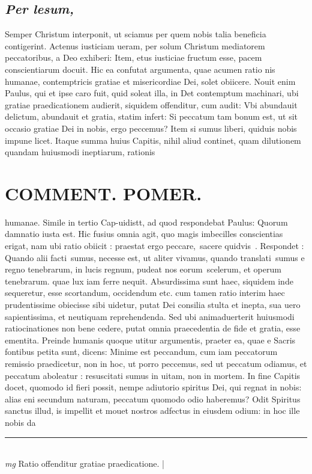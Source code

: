 \documentclass{article}
\begin{document}
\begin{pages}
\subsection*{\textit{Per lesum, }}\pstart Semper Christum interponit, ut sciamus per quem nobis talia beneficia contigerint.   \pend\pstart Actenus iusticiam ueram, per solum Christum mediatorem peccatoribus, a Deo exhiberi: Item, etus iusticiae fructum esse, pacem conscientiarum docuit. Hic ea confutat argumenta, quae acumen ratio nis humanae, contemptricis gratiae et misericordiae Dei, solet obiicere. Nouit enim Paulus, qui et ipse caro fuit, quid soleat illa, in Det contemptum machinari, ubi gratiae praedicationem audierit, siquidem offenditur, cum audit: Vbi abundauit delictum, abundauit et gratia, statim infert: Si peccatum tam bonum est, ut sit occasio gratiae Dei in nobis, ergo peccemus? Item si sumus liberi, quiduis nobis impune licet.  Itaque summa huius Capitis, nihil aliud continet, quam dilutionem quandam huiusmodi ineptiarum, rationis  \pend
\section*{COMMENT. POMER.  }\pstart humanae. Simile in tertio Cap-uidistt, ad quod respondebat Paulus: Quorum damnatio iusta est. Hic fusius omnia agit, quo magis imbecilles conscientias erigat, nam ubi ratio obiicit : praestat ergo peccare, sacere quidvis . Respondet : Quando alii facti sumus, necesse est, ut aliter vivamus, quando translati sumus e regno tenebrarum, in lucis regnum, pudeat nos eorum scelerum, et operum tenebrarum. quae lux iam ferre nequit. Absurdissima sunt haec, siquidem inde sequeretur, esse scortandum, occidendum etc. cum tamen ratio interim haec prudentissime obiecisse sibi uidetur, putat Dei consilia stulta et inepta, sua uero sapientissima, et neutiquam reprehendenda. Sed ubi animaduerterit huiusmodi ratiocinationes non bene cedere, putat omnia praecedentia de fide et gratia, esse ementita. Preinde humanis quoque utitur argumentis, praeter ea, quae e Sacris fontibus petita sunt, dicens: Minime est peccandum, cum iam peccatorum remissio praedicetur, non in hoc, ut porro peccemus, sed ut peccatum odiamus, et peccatum aboleatur : resuscitati sumus in uitam, non in mortem. In fine Capitis docet, quomodo id fieri possit, nempe adiutorio spiritus Dei, qui regnat in nobis: alias eni secundum naturam, peccatum quomodo odio haberemus? Odit Spiritus sanctus illud, is impellit et mouet nostros adfectus in eiusdem odium: in hoc ille nobis da\pend
\vspace{0.5cm}\noindent
\vspace{0.2cm}\rule{1cm}{0.2pt}\\ 
\hspace{0.2cm}\textit{mg}
\footnotesize Ratio offenditur gratiae praedicatione.  
\normalsize| 

\end{pages}
\end{document}
